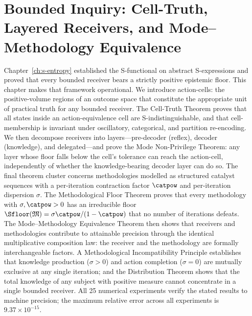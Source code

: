 
\providecommand{\Cell}{\mathcal{C}}
\providecommand{\Meth}{\mathfrak{M}}
\providecommand{\OutcomeX}{\mathcal{X}}
\providecommand{\NoiseFloor}{\beta}
\providecommand{\Know}{\mathrm{Know}}
\providecommand{\diam}{\mathrm{diam}}
\providecommand{\dom}{\mathrm{dom}}

\chapter{Bounded Inquiry: Cell-Truth, Layered Receivers, and Mode--Methodology Equivalence}
\label{ch:epistemology}


\begin{chapterabstract}
Chapter~\ref{ch:s-entropy} established the S-functional on abstract S-expressions and proved that every bounded receiver bears a strictly positive epistemic floor. This chapter makes that framework operational. We introduce action-cells: the positive-volume regions of an outcome space that constitute the appropriate unit of practical truth for any bounded receiver. The Cell-Truth Theorem proves that all states inside an action-equivalence cell are S-indistinguishable, and that cell-membership is invariant under oscillatory, categorical, and partition re-encoding. We then decompose receivers into layers---pre-decoder (reflex), decoder (knowledge), and delegated---and prove the Mode Non-Privilege Theorem: any layer whose floor falls below the cell's tolerance can reach the action-cell, independently of whether the knowledge-bearing decoder layer can do so. The final theorem cluster concerns methodologies modelled as structured catalyst sequences with a per-iteration contraction factor $\catpow$ and per-iteration dispersion $\sigma$. The Methodological Floor Theorem proves that every methodology with $\sigma, \catpow > 0$ has an irreducible floor $\Sfloor(\Meth) = \sigma\catpow/(1-\catpow)$ that no number of iterations defeats. The Mode--Methodology Equivalence Theorem then shows that receivers and methodologies contribute to attainable precision through the identical multiplicative composition law: the receiver and the methodology are formally interchangeable factors. A Methodological Incompatibility Principle establishes that knowledge production ($\sigma > 0$) and action completion ($\sigma = 0$) are mutually exclusive at any single iteration; and the Distribution Theorem shows that the total knowledge of any subject with positive measure cannot concentrate in a single bounded receiver. All 25 numerical experiments verify the stated results to machine precision; the maximum relative error across all experiments is $9.37 \times 10^{-15}$.
\end{chapterabstract}

